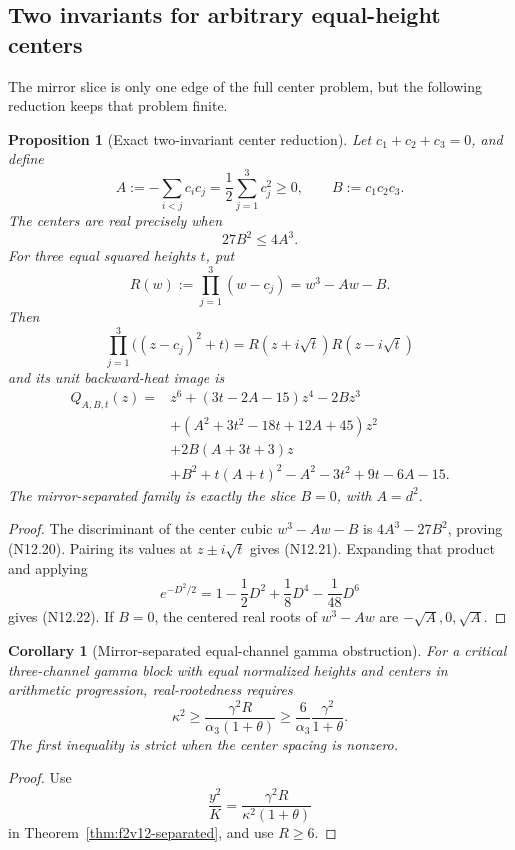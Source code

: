 \documentclass[11pt]{article}
\newtheorem{proposition}[theorem]{Proposition}
\newtheorem{corollary}[theorem]{Corollary}
\theoremstyle{definition}
\theoremstyle{remark}
\begin{document}
\subsection{Two invariants for arbitrary equal-height centers}

The mirror slice is only one edge of the full center problem, but the
following reduction keeps that problem finite.

\begin{proposition}[Exact two-invariant center reduction]
\label{prop:f2v12-invariants}
Let \(c_1+c_2+c_3=0\), and define
\[
 A:=-\sum_{i<j}c_ic_j
   =\frac12\sum_{j=1}^3c_j^2\ge0,
 \qquad
 B:=c_1c_2c_3.
 \tag{N12.19}
\]
The centers are real precisely when
\[
 27B^2\le4A^3.
 \tag{N12.20}
\]
For three equal squared heights \(t\), put
\[
 R(w):=\prod_{j=1}^3(w-c_j)=w^3-Aw-B.
\]
Then
\[
 \prod_{j=1}^3\bigl((z-c_j)^2+t\bigr)
 =R(z+i\sqrt t)R(z-i\sqrt t)
 \tag{N12.21}
\]
and its unit backward-heat image is
\[
\begin{aligned}
 Q_{A,B,t}(z)={}&z^6+(3t-2A-15)z^4-2Bz^3\\
 &+(A^2+3t^2-18t+12A+45)z^2\\
 &+2B(A+3t+3)z\\
 &+B^2+t(A+t)^2-A^2-3t^2+9t-6A-15.
\end{aligned}
\tag{N12.22}
\]
The mirror-separated family is exactly the slice \(B=0\), with
\(A=d^2\).
\end{proposition}

\begin{proof}
The discriminant of the center cubic \(w^3-Aw-B\) is
\(4A^3-27B^2\), proving \textup{(N12.20)}.  Pairing its values at
\(z\pm i\sqrt t\) gives \textup{(N12.21)}.  Expanding that product and
applying
\[
 e^{-D^2/2}=1-\frac12D^2+\frac18D^4-\frac1{48}D^6
\]
gives \textup{(N12.22)}.  If \(B=0\), the centered real roots of
\(w^3-Aw\) are \(-\sqrt A,0,\sqrt A\).
\end{proof}

\begin{corollary}[Mirror-separated equal-channel gamma obstruction]
\label{cor:f2v12-gamma}
For a critical three-channel gamma block with equal normalized heights and
centers in arithmetic progression, real-rootedness requires
\[
 \kappa^2\ge
 \frac{\gamma^2R}{\alpha_3(1+\theta)}
 \ge
 \frac6{\alpha_3}\frac{\gamma^2}{1+\theta}.
 \tag{N12.23}
\]
The first inequality is strict when the center spacing is nonzero.
\end{corollary}

\begin{proof}
Use
\[
 \frac{y^2}{K}
 =\frac{\gamma^2R}{\kappa^2(1+\theta)}
\]
in Theorem~\ref{thm:f2v12-separated}, and use \(R\ge6\).
\end{proof}
\end{document}
